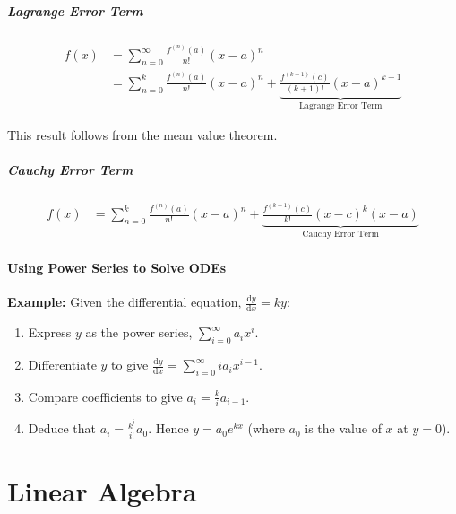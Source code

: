 \documentclass[10pt,twoside,twocolumn]{article}
\begin{document}
\subsubsection{Lagrange Error Term}

\begin{align*}
f\left(x\right) & =\sum_{n=0}^{\infty}\frac{f^{\left(n\right)}\left(a\right)}{n!}\left(x-a\right)^{n}\\
 & =\sum_{n=0}^{k}\frac{f^{\left(n\right)}\left(a\right)}{n!}\left(x-a\right)^{n}+\underbrace{\frac{f^{\left(k+1\right)}\left(c\right)}{\left(k+1\right)!}\left(x-a\right)^{k+1}}_{\text{Lagrange Error Term}}
\end{align*}


This result follows from the mean value theorem.


\subsubsection{Cauchy Error Term}

\begin{align*}
f\left(x\right) & =\sum_{n=0}^{k}\frac{f^{\left(n\right)}\left(a\right)}{n!}\left(x-a\right)^{n}+\underbrace{\frac{f^{\left(k+1\right)}\left(c\right)}{k!}\left(x-c\right)^{k}\left(x-a\right)}_{\text{Cauchy Error Term}}
\end{align*}



\subsection{Using Power Series to Solve ODEs}

\textbf{Example:} Given the differential equation, $\frac{\text{d}y}{\text{d}x}=ky$: 
\begin{enumerate}
\item Express $y$ as the power series, $\sum_{i=0}^{\infty}a_{i}x^{i}$. 
\item Differentiate $y$ to give $\frac{\text{d}y}{\text{d}x}=\sum_{i=0}^{\infty}ia_{i}x^{i-1}$. 
\item Compare coefficients to give $a_{i}=\frac{k}{i}a_{i-1}$. 
\item Deduce that $a_{i}=\frac{k^{i}}{i!}a_{0}$. Hence $y=a_{0}e^{kx}$
(where $a_{0}$ is the value of $x$ at $y=0$). 
\end{enumerate}
\pagebreak{}


\part{Linear Algebra}
\end{document}
